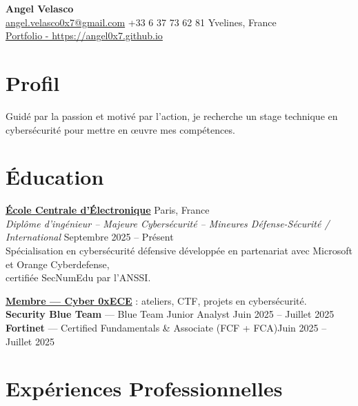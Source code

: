 \documentclass[a4paper,10pt]{article}
\newcommand{\linkedtitle}[2]{\href{#1}{\textbf{\color{myblue}#2}}}
\begin{document}
\begin{center}
    {\LARGE \textbf{Angel Velasco}}\\[3pt]
    \small
    \href{mailto:angel.velasco0x7@gmail.com}{angel.velasco0x7@gmail.com} \quad
    +33 6 37 73 62 81 \quad
    Yvelines, France \\
    {\Large \href{https://angel0x7.github.io}{Portfolio - https://angel0x7.github.io}} 
\end{center}



\section*{Profil}

\begin{center}
Guidé par la passion et motivé par l’action, je recherche un stage technique en cybersécurité pour mettre en œuvre mes compétences.
\end{center}

\section*{Éducation}

\noindent
\linkedtitle{https://www.ece.fr/en/program/engineering-cycle-bac4-information-systems-and-cybersecurity-major/}{École Centrale d'Électronique} \hfill Paris, France \\
\emph{Diplôme d'ingénieur – Majeure Cybersécurité – Mineures Défense-Sécurité / International} \hfill Septembre 2025 -- Présent \\
Spécialisation en cybersécurité défensive développée en partenariat avec Microsoft et Orange Cyberdefense,\\ certifiée SecNumEdu par l’ANSSI. 

\noindent
\textbf{\href{https://www.linkedin.com/company/asso0xece/}{Membre — Cyber 0xECE}} : ateliers, CTF, projets en cybersécurité. \\
\textbf{Security Blue Team} — Blue Team Junior Analyst \hfill Juin 2025 -- Juillet 2025 \\
\textbf{Fortinet} — Certified Fundamentals \& Associate (FCF + FCA)\hfill Juin 2025 -- Juillet 2025 
\section*{Expériences Professionnelles}
\end{document}
